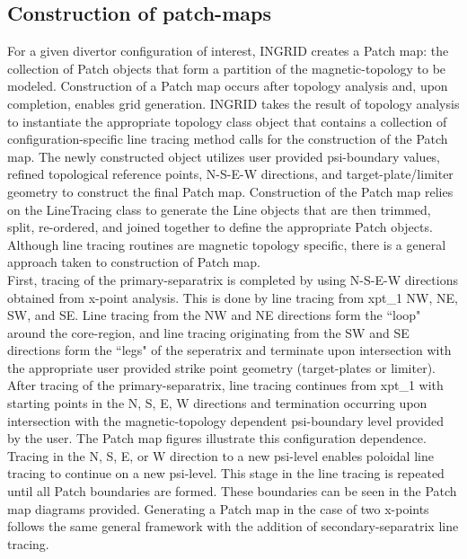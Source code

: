\subsection{Construction of patch-maps}
For a given divertor configuration of interest, INGRID creates a Patch map: the collection of Patch objects that form a partition of the magnetic-topology to be modeled. Construction of a Patch map occurs after topology analysis and, upon completion, enables grid generation. INGRID takes the result of topology analysis to instantiate the appropriate topology class object that contains a collection of configuration-specific line tracing method calls for the construction of the Patch map. The newly constructed object  utilizes user provided psi-boundary values, refined topological reference points, N-S-E-W directions, and target-plate/limiter geometry to construct the final Patch map. Construction of the Patch map relies on the LineTracing class to generate the Line objects that are then trimmed, split, re-ordered, and joined together to define the appropriate Patch objects. Although line tracing routines are magnetic topology specific, there is a general approach taken to construction of Patch map.\\
First, tracing of the primary-separatrix is completed by using N-S-E-W directions obtained from x-point analysis. This is done by line tracing from xpt\_1 NW, NE, SW, and SE. Line tracing from the NW and NE directions form the ``loop" around the core-region, and line tracing originating from the SW and SE directions form the ``legs" of the seperatrix and terminate upon intersection with the appropriate user provided strike point geometry (target-plates or limiter). \\
After tracing of the primary-separatrix, line tracing continues from xpt\_1 with starting points in the N, S, E, W directions and termination occurring upon intersection with the magnetic-topology dependent psi-boundary level provided by the user. The Patch map figures illustrate this configuration dependence. Tracing in the N, S, E, or W direction to a new psi-level enables poloidal line tracing to continue on a new psi-level. This stage in the line tracing is repeated until all Patch boundaries are formed. These boundaries can be seen in the Patch map diagrams provided. Generating a Patch map in the case of two x-points follows the same general framework with the addition of secondary-separatrix line tracing.